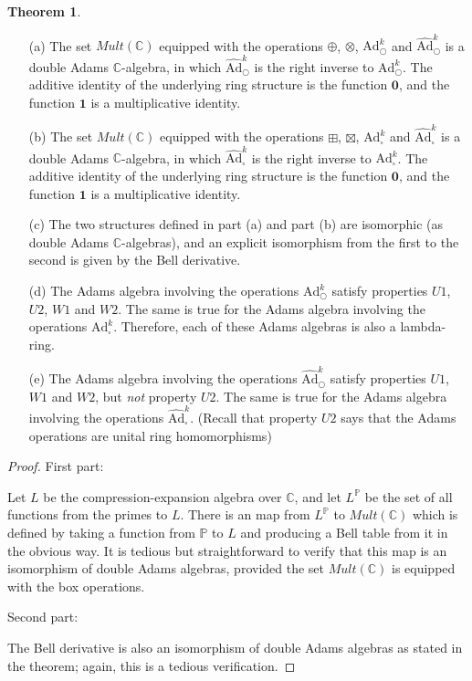\documentclass[a4paper]{article}
\theoremstyle{definition}
\newtheorem{theorem}{Theorem}[section]
\theoremstyle{remark}
\newcommand{\adam}[1]{\text{Ad}^{#1}_{\bigcirc}}
\newcommand{\hatadam}[1]{\widehat{\text{Ad}}^{#1}_{\bigcirc}}
\newcommand{\boxadam}[1]{\text{Ad}^{#1}_{\square}}
\newcommand{\hatboxadam}[1]{\widehat{\text{Ad}}^{#1}_{\square}}
\newcommand{\C}{\mathbb{C}}
\begin{document}
\begin{theorem}
\begin{itemize}
\item[(a)] The set $Mult(\mathbb{C})$ equipped with the operations $\oplus$, $\otimes$, $\adam{k}$ and $\hatadam{k}$ is a double Adams $\C$-algebra, in which $\hatadam{k}$ is the right inverse to $\adam{k}$. The additive identity of the underlying ring structure is the function $\mathbf{0}$, and the function $\mathbf{1}$ is a multiplicative identity. 
\item[(b)] The set $Mult(\mathbb{C})$ equipped with the operations $\boxplus$, $\boxtimes$, $\boxadam{k}$ and $\hatboxadam{k}$ is a double Adams $\C$-algebra, in which $\hatboxadam{k}$ is the right inverse to $\boxadam{k}$. The additive identity of the underlying ring structure is the function $\mathbf{0}$, and the function $\mathbf{1}$ is a multiplicative identity. 
\item[(c)] The two structures defined in part (a) and part (b) are isomorphic (as double Adams $\C$-algebras), and an explicit isomorphism from the first to the second is given by the Bell derivative. 
\item[(d)] The Adams algebra involving the operations $\adam{k}$ satisfy properties $U1$, $U2$, $W1$ and $W2$. The same is true for the Adams algebra involving the operations $\boxadam{k}$. Therefore, each of these Adams algebras is also a lambda-ring.
\item[(e)] The Adams algebra involving the operations $\hatadam{k}$ satisfy properties $U1$, $W1$ and $W2$, but \emph{not} property $U2$. The same is true for the Adams algebra involving the operations $\hatboxadam{k}$. (Recall that property $U2$ says that the Adams operations are unital ring homomorphisms)
\end{itemize}
\end{theorem}
\begin{proof}
First part:

Let $L$ be the compression-expansion algebra over $\C$, and let $L^{\mathbb{P}}$ be the set of all functions from the primes to $L$. There is an map from $L^{\mathbb{P}}$ to $Mult(\mathbb{C})$ which is defined by taking a function from $\mathbb{P}$ to $L$ and producing a Bell table from it in the obvious way. It is tedious but straightforward to verify that this map is an isomorphism of double Adams algebras, provided the set $Mult(\mathbb{C})$ is equipped with the box operations. 

Second part:

The Bell derivative is also an isomorphism of double Adams algebras as stated in the theorem; again, this is a tedious verification. 


\end{proof}
\end{document}
